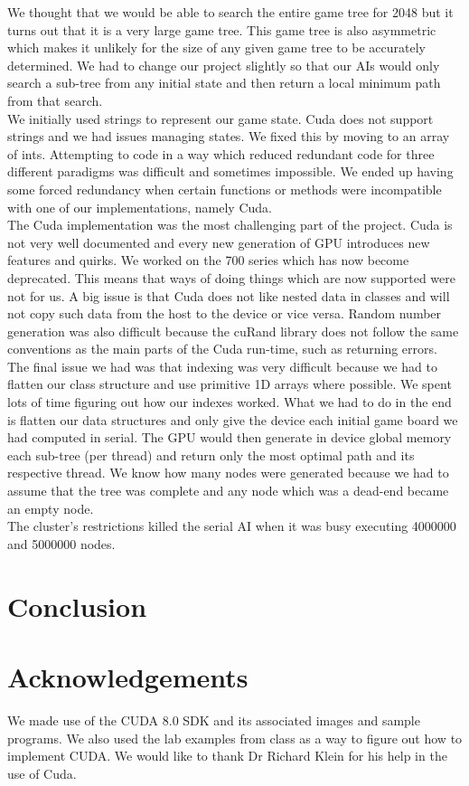 \documentclass[a4paper]{article}
\begin{document}
We thought that we would be able to search the entire game tree for 2048 but it turns out that it is a very large game tree. This game tree is also asymmetric which makes it unlikely for the size of any given game tree to be accurately determined. We had to change our project slightly so that our AIs would only search a sub-tree from any initial state and then return a local minimum path from that search.\\

We initially used strings to represent our game state. Cuda does not support strings and we had issues managing states. We fixed this by moving to an array of ints.
Attempting to code in a way which reduced redundant code for three different paradigms was difficult and sometimes impossible. We ended up having some forced redundancy when certain functions or methods were incompatible with one of our implementations, namely Cuda.\\

The Cuda implementation was the most challenging part of the project. Cuda is not very well documented and every new generation of GPU introduces new features and quirks. We worked on the 700 series which has now become deprecated. This means that ways of doing things which are now supported were not for us. A big issue is that Cuda does not like nested data in classes and will not copy such data from the host to the device or vice versa. Random number generation was also difficult because the cuRand library does not follow the same conventions as the main parts of the Cuda run-time, such as returning errors. The final issue we had was that indexing was very difficult because we had to flatten our class structure and use primitive 1D arrays where possible. We spent lots of time figuring out how our indexes worked. What we had to do in the end is flatten our data structures and only give the device each initial game board we had computed in serial. The GPU would then generate in device global memory each sub-tree (per thread) and return only the most optimal path and its respective thread. We know how many nodes were generated because we had to assume that the tree was complete and any node which was a dead-end became an empty node.\\

The cluster’s restrictions killed the serial AI when it was busy executing 4000000 and 5000000 nodes.


\section{Conclusion}

\section*{Acknowledgements}
We made use of the CUDA 8.0 SDK and its associated images and sample programs. We also used the lab examples from class as a way to figure out how to implement CUDA. We would like to thank Dr Richard Klein for his help in the use of Cuda.


{}
\end{document}
